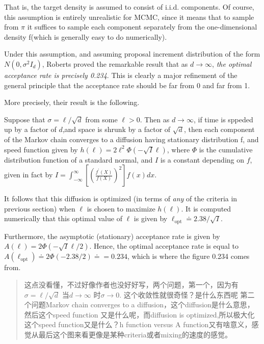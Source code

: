 \documentclass[
]{book}
\theoremstyle{definition}
\theoremstyle{definition}
\theoremstyle{definition}
\theoremstyle{remark}
\begin{document}
That is, the target density is assumed to consist of i.i.d. components. Of course, this assumption is entirely unrealistic for MCMC, since it means that to sample from \(\pi\) it suffices to sample each component separately from the one-dimensional density f(which is generally easy to do numerically).

Under this assumption, and assuming proposal increment distribution of the form \(N(0,\sigma^2I_d)\), Roberts proved the remarkable result that as \(d\rightarrow \infty\), \emph{the optimal acceptance rate is precisely 0.234}. This is clearly a major refinement of the general principle that the acceptance rate should be far from 0 and far from 1.

More precisely, their result is the following.

Suppose that \(\sigma=\ell/\sqrt d\) from some \(\ell>0\). Then as \(d\rightarrow \infty\), if time is sppeded up by a factor of \(d\),and space is shrunk by a factor of \(\sqrt d\), then each component of the Markov chain converges to a diffusion having stationary distribution f, and speed function given by \(h(\ell)=2\ell^2\Phi(-\sqrt I \ell)\), where \(\Phi\) is the cumulative distribution function of a standard normal, and \(I\) is a constant depending on \(f\), given in fact by \(I=\int_{-\infty}^{\infty}\left[\left(\frac{f^{\prime}(X)}{f(X)}\right)^{2}\right] f(x) d x\).

It follows that this diffusion is optimized (in terms of \emph{any} of the criteria in previous section) when \(\ell\) is chosen to maximize \(h(\ell)\). It is computed numerically that this optimal value of \(\ell\) is given by \(\ell_{\mathrm{opt}} \doteq 2.38 / \sqrt{I}\).

Furthermore, the asymptotic (stationary) acceptance rate is given by \(A(\ell)=2 \Phi(-\sqrt{I} \ell / 2)\). Hence, the optimal acceptance rate is equal to \(A\left(\ell_{\mathrm{opt}}\right) \doteq 2 \Phi(-2.38 / 2) \doteq=0.234\), which is where the figure 0.234 comes from.

\begin{quote}
这点没看懂，不过好像作者也没好好写，两个问题，第一个，因为有\(\sigma=\ell/\sqrt d\) 当\(d\rightarrow \infty\) 时\(\sigma\rightarrow 0\). 这个收敛性就很奇怪？是什么东西呢 第二个问题Markov chain converges to a diffusion，这个diffusion是什么意思，然后这个speed function 又是什么呢，而diffusion is optimized,所以极大化这个speed function又是什么？h function versus A function又有啥意义，感觉从最后这个图来看更像是某种criteria或者mixing的速度的感觉。
\end{quote}
\end{document}
